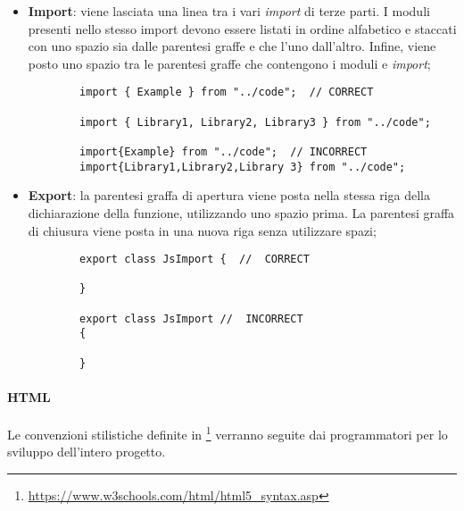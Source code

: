 \begin{itemize}
	\item{\textbf{Import}: viene lasciata una linea tra i vari \emph{import} di terze parti. I moduli presenti nello stesso import devono essere listati in ordine alfabetico e staccati con uno spazio sia dalle parentesi graffe e che l'uno dall'altro. Infine, viene posto uno spazio tra le parentesi graffe che contengono i moduli e \emph{import}; }
	\begin{lstlisting}
		import { Example } from "../code";  // CORRECT
		
		import { Library1, Library2, Library3 } from "../code";
		
		import{Example} from "../code";  // INCORRECT
		import{Library1,Library2,Library 3} from "../code";
	\end{lstlisting}
	
	\item{\textbf{Export}: la parentesi graffa di apertura viene posta nella stessa riga della dichiarazione della funzione, utilizzando uno spazio prima. La parentesi graffa di chiusura viene posta in una nuova riga senza utilizzare spazi;}	
	\begin{lstlisting}
		export class JsImport {  //  CORRECT
		
		}
		
		export class JsImport //  INCORRECT
		{  
		
		}
	\end{lstlisting}
\end{itemize}

\paragraph{HTML}\Spazio
Le convenzioni stilistiche definite in \footnote{\url{https://www.w3schools.com/html/html5_syntax.asp}} verranno seguite dai programmatori per lo sviluppo dell'intero progetto.


